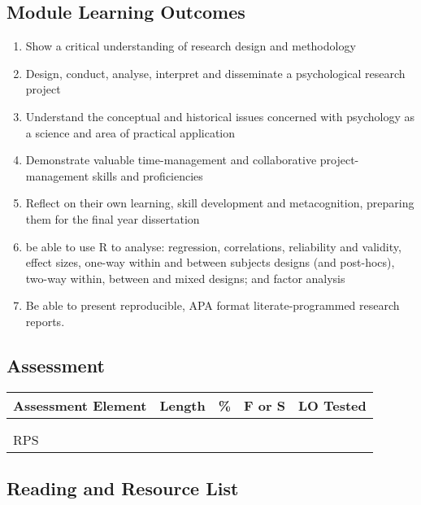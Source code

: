 \documentclass[
  11pt,
  letterpaper,
  oneside,
  open=any]{scrbook}
\begin{document}
\hypertarget{module-learning-outcomes-1}{%
\subsection{Module Learning Outcomes}\label{module-learning-outcomes-1}}

\begin{enumerate}
\def\labelenumi{\arabic{enumi}.}
\item
  Show a critical understanding of research design and methodology
\item
  Design, conduct, analyse, interpret and disseminate a psychological
  research project
\item
  Understand the conceptual and historical issues concerned with
  psychology as a science and area of practical application
\item
  Demonstrate valuable time-management and collaborative
  project-management skills and proficiencies
\item
  Reflect on their own learning, skill development and metacognition,
  preparing them for the final year dissertation
\item
  be able to use R to analyse: regression, correlations, reliability and
  validity, effect sizes, one-way within and between subjects designs
  (and post-hocs), two-way within, between and mixed designs; and factor
  analysis
\item
  Be able to present reproducible, APA format literate-programmed
  research reports.
\end{enumerate}

\hypertarget{assessment-1}{%
\subsection{Assessment}\label{assessment-1}}

\begin{longtable}[]{@{}lllll@{}}
\toprule()
Assessment Element & Length & \% & F or S & LO Tested \\
\midrule()
\endhead
& & & & \\
& & & & \\
RPS & & & & \\
\bottomrule()
\end{longtable}

\hypertarget{reading-and-resource-list-1}{%
\subsection{Reading and Resource
List}\label{reading-and-resource-list-1}}
\end{document}
